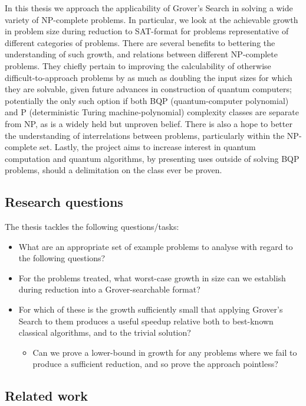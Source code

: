 \documentclass[msc,lith,english]{liuthesis}
\begin{document}
In this thesis we approach the applicability of Grover's Search in solving a wide variety of NP-complete problems. In particular, we look at the achievable growth in problem size during reduction to SAT-format for problems representative of different categories of problems. There are several benefits to bettering the understanding of such growth, and relations between different NP-complete problems. They chiefly pertain to improving the calculability of otherwise difficult-to-approach problems by as much as doubling the input sizes for which they are solvable, given future advances in construction of quantum computers; potentially the only such option if both BQP (quantum-computer polynomial) and P (deterministic Turing machine-polynomial) complexity classes are separate from NP, as is a widely held but unproven belief. There is also a hope to better the understanding of interrelations between problems, particularly within the NP-complete set. Lastly, the project aims to increase interest in quantum computation and quantum algorithms, by presenting uses outside of solving BQP problems, should a delimitation on the class ever be proven.

\subsection{Research questions}
The thesis tackles the following questions/tasks:
\begin{itemize}
    \item What are an appropriate set of example problems to analyse with regard to the following questions?
    \item For the problems treated, what worst-case growth in size can we establish during reduction into a Grover-searchable format?
    \item For which of these is the growth sufficiently small that applying Grover's Search to them produces a useful speedup relative both to best-known classical algorithms, and to the trivial solution?
    \begin{itemize}
        \item Can we prove a lower-bound in growth for any problems where we fail to produce a sufficient reduction, and so prove the approach pointless?
    \end{itemize}
\end{itemize}

\subsection{Related work}
\end{document}
